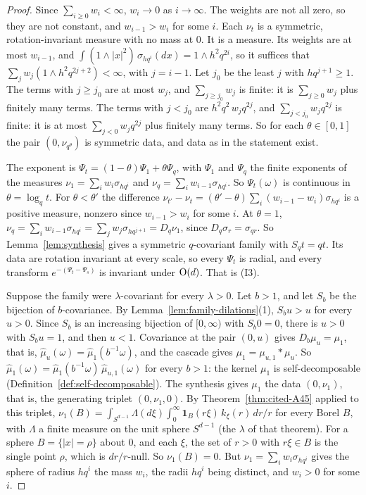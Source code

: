 \begin{proof}
Since $\sum_{i \ge 0}w_i < \infty$, $w_i \to 0$ as $i \to \infty$. The weights are not all zero, so
they are not constant, and $w_{i-1} > w_i$ for some $i$. Each $\nu_t$ is a symmetric,
rotation-invariant measure with no mass at $0$. It is a \Levy{} measure. Its weights are at most
$w_{i-1}$, and $\int(1 \wedge |x|^2)\,\sigma_{hq^i}(dx) = 1 \wedge h^2q^{2i}$, so it suffices that
$\sum_jw_j(1 \wedge h^2q^{2j+2}) < \infty$, with $j = i - 1$. Let $j_0$ be the least $j$ with
$hq^{j+1} \ge 1$. The terms with $j \ge j_0$ are at most $w_j$, and
$\sum_{j \ge j_0}w_j$ is finite: it is $\sum_{j \ge 0}w_j$ plus finitely many terms. The terms with
$j < j_0$ are $h^2q^2\,w_jq^{2j}$, and $\sum_{j < j_0}w_jq^{2j}$ is finite: it is at most
$\sum_{j<0}w_jq^{2j}$ plus finitely many terms. So for each $\theta \in [0, 1]$ the pair
$(0, \nu_{q^\theta})$ is symmetric \Levy{} data, and data as in the statement exist.

The exponent is $\Psi_t = (1 - \theta)\Psi_1 + \theta\Psi_q$, with $\Psi_1$ and $\Psi_q$ the finite
exponents of the \Levy{} measures $\nu_1 = \sum_iw_i\sigma_{hq^i}$ and
$\nu_q = \sum_iw_{i-1}\sigma_{hq^i}$. So
$\Psi_t(\omega)$ is continuous in $\theta = \log_qt$. For $\theta < \theta'$ the difference
$\nu_{t'} - \nu_t = (\theta' - \theta)\sum_i(w_{i-1} - w_i)\sigma_{hq^i}$ is a positive measure,
nonzero since $w_{i-1} > w_i$ for some $i$. At $\theta = 1$,
$\nu_q = \sum_iw_{i-1}\sigma_{hq^i} = \sum_jw_j\sigma_{hq^{j+1}} = D_q\nu_1$, since
$D_q\sigma_r = \sigma_{qr}$. So Lemma~\ref{lem:synthesis} gives a symmetric $q$-covariant family with
$S_qt = qt$. Its data are rotation invariant at every scale, so every $\Psi_t$ is radial, and every
transform $e^{-(\Psi_t - \Psi_s)}$ is invariant under $\mathrm{O}(d)$. That is (I3).

Suppose the family were $\lambda$-covariant for every $\lambda > 0$. Let $b > 1$, and let $S_b$ be
the bijection of $b$-covariance. By Lemma~\ref{lem:family-dilations}(1), $S_bu > u$ for every
$u > 0$. Since $S_b$ is an increasing bijection of $[0,\infty)$ with $S_b0 = 0$, there is $u > 0$ with
$S_bu = 1$, and then $u < 1$. Covariance at the pair $(0, u)$ gives $D_b\mu_u = \mu_1$, that is,
$\widehat\mu_u(\omega) = \widehat\mu_1(b^{-1}\omega)$, and the cascade gives
$\mu_1 = \mu_{u,1} * \mu_u$. So $\widehat\mu_1(\omega) = \widehat\mu_1(b^{-1}\omega)\,\widehat\mu_{u,1}(\omega)$
for every $b > 1$: the kernel $\mu_1$ is self-decomposable (Definition~\ref{def:self-decomposable}).
The synthesis gives $\mu_1$ the data $(0, \nu_1)$, that is, the generating triplet
$(0, \nu_1, 0)$. By Theorem~\ref{thm:cited-A45} applied to this triplet,
$\nu_1(B) = \int_{S^{d-1}}\Lambda(d\xi)\int_0^\infty\mathbf 1_B(r\xi)\,k_\xi(r)\,dr/r$ for every
Borel $B$, with $\Lambda$ a finite measure on the unit sphere $S^{d-1}$ (the $\lambda$ of that
theorem). For a sphere
$B = \{|x| = \rho\}$ about $0$, and each $\xi$, the set of $r > 0$ with $r\xi \in B$ is the single
point $\rho$, which is $dr/r$-null. So $\nu_1(B) = 0$. But
$\nu_1 = \sum_iw_i\sigma_{hq^i}$ gives the sphere of radius $hq^i$ the mass $w_i$, the radii $hq^i$
being distinct, and $w_i > 0$ for some $i$.


\end{proof}
